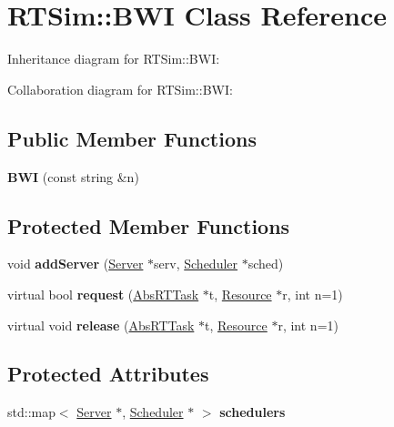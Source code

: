 \hypertarget{classRTSim_1_1BWI}{}\section{R\+T\+Sim\+:\+:B\+WI Class Reference}
\label{classRTSim_1_1BWI}


Inheritance diagram for R\+T\+Sim\+:\+:B\+WI\+:


Collaboration diagram for R\+T\+Sim\+:\+:B\+WI\+:
\subsection*{Public Member Functions}
\begin{DoxyCompactItemize}
\item 
{\bfseries B\+WI} (const string \&n)\hypertarget{classRTSim_1_1BWI_a9466fc6ea8140d67b67c60df6bcabe48}{}\label{classRTSim_1_1BWI_a9466fc6ea8140d67b67c60df6bcabe48}

\end{DoxyCompactItemize}
\subsection*{Protected Member Functions}
\begin{DoxyCompactItemize}
\item 
void {\bfseries add\+Server} (\hyperlink{classRTSim_1_1Server}{Server} $\ast$serv, \hyperlink{classRTSim_1_1Scheduler}{Scheduler} $\ast$sched)\hypertarget{classRTSim_1_1BWI_ac8be83d057e080e819bf4fae677e0274}{}\label{classRTSim_1_1BWI_ac8be83d057e080e819bf4fae677e0274}

\item 
virtual bool {\bfseries request} (\hyperlink{classRTSim_1_1AbsRTTask}{Abs\+R\+T\+Task} $\ast$t, \hyperlink{classRTSim_1_1Resource}{Resource} $\ast$r, int n=1)\hypertarget{classRTSim_1_1BWI_a77bdd8b01d116f0f22fad11deb023640}{}\label{classRTSim_1_1BWI_a77bdd8b01d116f0f22fad11deb023640}

\item 
virtual void {\bfseries release} (\hyperlink{classRTSim_1_1AbsRTTask}{Abs\+R\+T\+Task} $\ast$t, \hyperlink{classRTSim_1_1Resource}{Resource} $\ast$r, int n=1)\hypertarget{classRTSim_1_1BWI_af74b12440138cc7f3532331b046a5a72}{}\label{classRTSim_1_1BWI_af74b12440138cc7f3532331b046a5a72}

\end{DoxyCompactItemize}
\subsection*{Protected Attributes}
\begin{DoxyCompactItemize}
\item 
std\+::map$<$ \hyperlink{classRTSim_1_1Server}{Server} $\ast$, \hyperlink{classRTSim_1_1Scheduler}{Scheduler} $\ast$ $>$ {\bfseries schedulers}\hypertarget{classRTSim_1_1BWI_abecc04688422de34cb215ce0dd2e1b8e}{}\label{classRTSim_1_1BWI_abecc04688422de34cb215ce0dd2e1b8e}

\end{DoxyCompactItemize}
